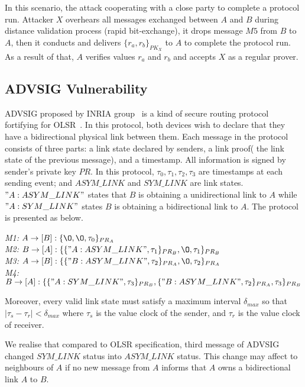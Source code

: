 In this scenario, the attack cooperating with a close party to complete a protocol run. Attacker $X$ overhears all messages exchanged between $A$ and $B$ during distance validation process (rapid bit-exchange), it drops message $M5$ from $B$ to $A$, then it conducts and delivers $\{r_a,r_b\}_{PK_X}$ to $A$ to complete the protocol run. As a result of that, $A$ verifies values $r_a$ and $r_b$ and accepts $X$ as a regular prover. 

\subsection{ADVSIG Vulnerability}

ADVSIG proposed by INRIA group~\cite{Raffo:2004:ASS:1029102.1029106} is a kind of secure routing protocol fortifying for OLSR~\cite{Clausen:2003:OLS:RFC3626}. In this protocol, both devices wish to declare that they have a bidirectional physical link between them. Each message in the protocol consists of three parts: a link state declared by senders, a link proof( the link state of the previous message), and a timestamp. All information is signed by sender's private key $PR$. In this protocol, $\tau_0, \tau_1,\tau_2,\tau_3$ are timestamps at each sending event; and $ASYM\_LINK$ and $SYM\_LINK$ are link states. $"A:ASYM\_LINK"$ states that $B$ is obtaining a unidirectional link to $A$ while $"A:SYM\_LINK"$ states $B$ is obtaining a bidirectional link to $A$. The protocol is presented as below.

\begin{flushleft}
 \emph{M1:} $A \to [B]: \{\O, \O, \tau_0\}_{PR_A}$\\
 \emph{M2:} $B \to [A]: \{\{"A:ASYM\_LINK", \tau_1\}_{PR_B}, \O,\tau_1\}_{PR_B}$\\
\emph{M3:} $A \to [B]: \{\{"B:ASYM\_LINK",\tau_2\}_{PR_A},\O ,\tau_2 \}_{PR_A}$\\
 \emph{M4:} $B \to [A] : \{\{"A:SYM\_LINK", \tau_3\}_{PR_B} ,\{"B:ASYM\_LINK",\tau_2\}_{PR_A} ,\tau_3\}_{PR_B}$
\end{flushleft}

Moreover, every valid link state must satisfy a maximum interval $\delta_{max}$ so that $|\tau_{s} - \tau_r | < \delta_{max}$ where $\tau_{s}$ is the value clock of the sender, and $\tau_r$ is the value clock of receiver. 

We realise that compared to OLSR specification, third message of ADVSIG changed $SYM\_LINK$ status into $ASYM\_LINK$ status. This change may affect to neighbours of $A$ if no new message from $A$ informs that $A$ owns a bidirectional link $A$ to $B$. 

